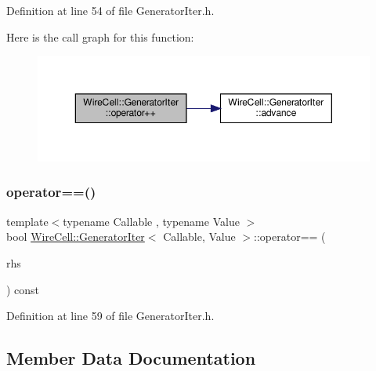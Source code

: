 Definition at line 54 of file Generator\+Iter.\+h.

Here is the call graph for this function\+:
\nopagebreak
\begin{figure}[H]
\begin{center}
\leavevmode
\includegraphics[width=350pt]{struct_wire_cell_1_1_generator_iter_a017176bffd48d6849a86840c21a0d97e_cgraph}
\end{center}
\end{figure}
\mbox{\label{struct_wire_cell_1_1_generator_iter_aad7a21fe64122c1626f6af8c7d42d7c6}} 
\subsubsection{\texorpdfstring{operator==()}{operator==()}}
{\footnotesize\ttfamily template$<$typename Callable , typename Value $>$ \\
bool \hyperlink{struct_wire_cell_1_1_generator_iter}{Wire\+Cell\+::\+Generator\+Iter}$<$ Callable, Value $>$\+::operator== (\begin{DoxyParamCaption}\item[{const \hyperlink{struct_wire_cell_1_1_generator_iter}{Generator\+Iter}$<$ Callable, Value $>$ \&}]{rhs }\end{DoxyParamCaption}) const\hspace{0.3cm}{\ttfamily [inline]}}



Definition at line 59 of file Generator\+Iter.\+h.



\subsection{Member Data Documentation}
\mbox{\label{struct_wire_cell_1_1_generator_iter_a1a458da534a9445b1cffc79256218e0b}} 

